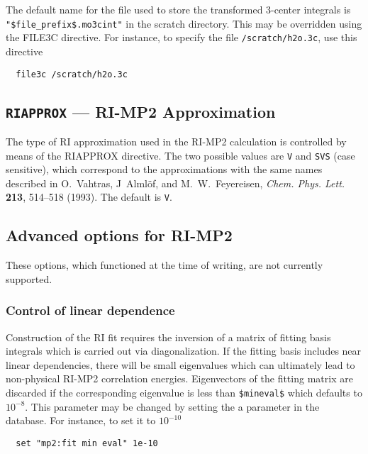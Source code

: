 \sloppy

The default name for the file used to store the transformed 3-center
integrals is \verb+"$file_prefix$.mo3cint"+ in the scratch directory.
This may be overridden using the FILE3C directive.  For instance, to
specify the file \verb+/scratch/h2o.3c+, use this directive
\begin{verbatim}
  file3c /scratch/h2o.3c
\end{verbatim}

\fussy


\subsection{{\tt RIAPPROX} --- RI-MP2 Approximation}

The type of RI approximation used in the RI-MP2 calculation is controlled
by means of the RIAPPROX directive.  The two possible values are
\verb+V+ and \verb+SVS+ (case sensitive), which correspond to the
approximations with the same names described in O.~Vahtras, J~Alml\"of,
and M.~W.~Feyereisen, {\em Chem. Phys. Lett.} {\bf 213}, 514--518
(1993).  The default is \verb+V+.


\subsection{Advanced options for RI-MP2}

These options, which functioned at the time of writing, are not
currently supported.

\subsubsection{Control of linear dependence}

Construction of the RI fit requires the inversion of a matrix of
fitting basis integrals which is carried out via diagonalization.  If
the fitting basis includes near linear dependencies, there will be
small eigenvalues which can ultimately lead to non-physical RI-MP2
correlation energies.  Eigenvectors of the fitting matrix 
are discarded if the corresponding eigenvalue is less than
\verb+$mineval$+ which defaults to $10^{-8}$.  This 
parameter may be changed by setting the a parameter in the database.
For instance, to set it to $10^{-10}$

\begin{verbatim}
  set "mp2:fit min eval" 1e-10
\end{verbatim}

